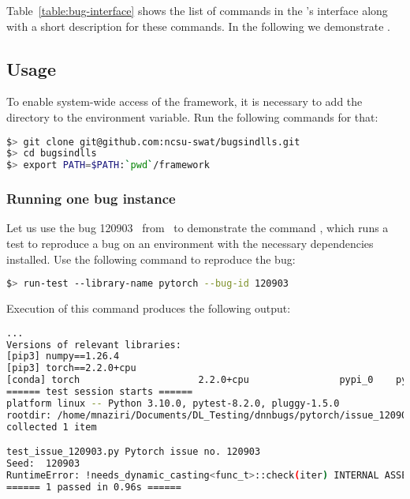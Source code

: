 \documentclass[sigconf,screen]{acmart}
\begin{document}
Table~\ref{table:bug-interface} shows the list of commands in the
\tname's interface along with a short description for these
commands. In the following we demonstrate \tname.

\subsection{Usage}
\label{sec:usage}

To enable system-wide access of the framework, it is necessary to add
the directory  to the  environment
variable. Run the following commands for that:

\begin{lstlisting}[language=bash,basicstyle=\small,]
$> git clone git@github.com:ncsu-swat/bugsindlls.git
$> cd bugsindlls
$> export PATH=$PATH:`pwd`/framework
\end{lstlisting}


\subsubsection{Running one bug instance}



Let us use the bug 120903~\cite{torch120903} from \torch\ to demonstrate the
command , which runs a test to reproduce a bug on an
environment with the necessary dependencies installed. Use the
following command to reproduce the bug:

\begin{lstlisting}[language=bash,basicstyle=\small,]
$> run-test --library-name pytorch --bug-id 120903
\end{lstlisting}

\noindent
Execution of this command produces the following output:

\begin{lstlisting}[language=bash,basicstyle=\small,]
... 
Versions of relevant libraries:
[pip3] numpy==1.26.4
[pip3] torch==2.2.0+cpu
[conda] torch                     2.2.0+cpu                pypi_0    pypi
====== test session starts ======
platform linux -- Python 3.10.0, pytest-8.2.0, pluggy-1.5.0
rootdir: /home/mnaziri/Documents/DL_Testing/dnnbugs/pytorch/issue_120903
collected 1 item                                                                            

test_issue_120903.py Pytorch issue no. 120903
Seed:  120903
RuntimeError: !needs_dynamic_casting<func_t>::check(iter) INTERNAL ASSERT FAILED at "../aten/src/ATen/native/cpu/Loops.h":310, please report a bug to PyTorch. 
====== 1 passed in 0.96s ======
\end{lstlisting}
\end{document}
